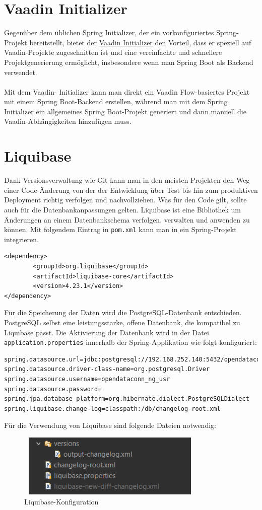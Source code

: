 \documentclass[a4paper,12pt]{scrreprt}
\begin{document}
	\section{Vaadin Initializer}
	Gegenüber dem üblichen \href{https://start.spring.io/} {Spring Initializer}, der ein vorkonfiguriertes Spring-Projekt bereitstellt, bietet der \href{https://start.vaadin.com/app/p} {Vaadin Initializer} den Vorteil, dass er speziell auf Vaadin-Projekte zugeschnitten ist und eine vereinfachte und schnellere Projektgenerierung ermöglicht, insbesondere wenn man Spring Boot als Backend verwendet.\\ \\ Mit dem Vaadin- Initializer kann man direkt ein Vaadin Flow-basiertes Projekt mit einem Spring Boot-Backend erstellen, während man mit dem Spring Initializer ein allgemeines Spring Boot-Projekt generiert und dann manuell die Vaadin-Abhängigkeiten hinzufügen muss.
	
	\section{Liquibase}
	Dank Versionsverwaltung wie Git kann man in den meisten Projekten den Weg einer Code-Änderung von der der Entwicklung über Test bis hin zum produktiven Deployment richtig verfolgen und nachvollziehen. Was für den Code gilt, sollte auch für die Datenbankanpassungen gelten. Liquibase ist eine Bibliothek um Änderungen an einem Datenbankschema verfolgen, verwalten und anwenden zu können. Mit folgendem Eintrag in \texttt{pom.xml} kann man in ein Spring-Projekt integrieren.
\begin{lstlisting}[language=POM]
<dependency>
		<groupId>org.liquibase</groupId>
		<artifactId>liquibase-core</artifactId>
		<version>4.23.1</version>
</dependency>
\end{lstlisting}
	Für die Speicherung der Daten wird die PostgreSQL-Datenbank entschieden. PostgreSQL selbst eine leistungsstarke, offene Datenbank, die kompatibel zu Liquibase passt. Die Aktivierung der Datenbank wird in der Datei \texttt{application.properties} innerhalb der Spring-Applikation wie folgt konfiguriert:
\begin{lstlisting}[language=properties]
spring.datasource.url=jdbc:postgresql://192.168.252.140:5432/opendataconn_ng
spring.datasource.driver-class-name=org.postgresql.Driver
spring.datasource.username=opendataconn_ng_usr
spring.datasource.password=
spring.jpa.database-platform=org.hibernate.dialect.PostgreSQLDialect
spring.liquibase.change-log=classpath:/db/changelog-root.xml
\end{lstlisting}
	Für die Verwendung von Liquibase sind folgende Dateien notwendig:
	\begin{figure}[h!]
		\centering
		\includegraphics[width=9cm, height=3cm]{liquibase-changelog.png}
		\caption{\label{datenbank:konfiguration} Liquibase-Konfiguration}
	\end{figure}
\end{document}

